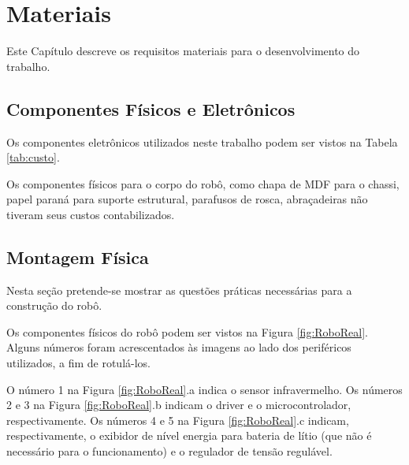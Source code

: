 \chapter{Materiais}
\vspace{-2.5 cm}

Este Capítulo descreve os requisitos materiais para o desenvolvimento do
trabalho. 

\section{Componentes Físicos e Eletrônicos}

Os componentes eletrônicos utilizados neste trabalho podem ser vistos na Tabela 
\ref{tab:custo}.



Os componentes físicos para o corpo do robô, como chapa de MDF para o chassi, papel 
paraná para suporte estrutural, parafusos de rosca, abraçadeiras não tiveram 
seus custos contabilizados.

\section{Montagem Física}

	Nesta seção pretende-se mostrar as questões práticas necessárias para a construção do 
	robô.
	
	Os componentes físicos do robô podem ser vistos na Figura \ref{fig:RoboReal}. Alguns
	números foram acrescentados às imagens ao lado dos periféricos utilizados, a fim de 
	rotulá-los.
	
	
	
	O número 1 na Figura \ref{fig:RoboReal}.a indica o sensor infravermelho. Os números 2 e 3
	na Figura \ref{fig:RoboReal}.b indicam o driver e o microcontrolador, respectivamente.
	Os números 4 e 5 na Figura \ref{fig:RoboReal}.c indicam, respectivamente, o exibidor
	de nível energia para bateria de lítio (que não é necessário para o funcionamento) 
	e o regulador de tensão regulável. 
	
